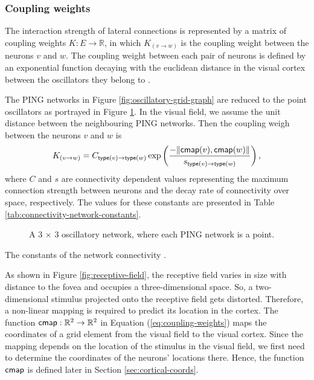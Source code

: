 \subsubsection{Coupling weights}

The interaction strength of lateral connections is represented by a matrix of coupling weights $K: E \to \mathbb{R}$, in which $K_{(v \to w)}$ is the coupling weight between the neurons $v$ and $w$. 
The coupling weight between each pair of neurons is defined by an exponential function decaying with the euclidean distance in the visual cortex between the oscillators they belong to \cite{Lowet2015}. 

The PING networks in Figure \ref{fig:oscillatory-grid-graph} are reduced to the point oscillators as portrayed in Figure \ref{fig:oscillatory-point-grid}. In the visual field, we assume the unit distance between the neighbouring PING networks. Then the coupling weigh between the neurons $v$ and $w$ is
\begin{equation}
    K_{(v \to w)} = C_{\mathsf{type}(v) \to \mathsf{type}(w)} \exp \left( \frac{-\| \mathsf{cmap}(v), \mathsf{cmap}(w) \|}{s_{\mathsf{type}(v) \to \mathsf{type}(w)}} \right),
    \label{eq:coupling-weights}
\end{equation}
where $C$ and $s$ are connectivity dependent values representing the maximum connection strength between neurons and the decay rate of connectivity over space, respectively. The values for these constants are presented in Table \ref{tab:connectivity-network-constants}.

\begin{figure}[!htp]
    \centering
    
    \caption[Point-PING oscillatory network]{A 3 $\times$ 3 oscillatory network, where each PING network is a point.}
    \label{fig:oscillatory-point-grid}
\end{figure}

\begin{table}[!htp] 
    \centering
    
    \caption[Constants of the network connectivity]{The constants of the network connectivity \cite{Lowet2015}.}
    \label{tab:connectivity-network-constants}
\end{table}

As shown in Figure \ref{fig:receptive-field}, the receptive field varies in size with distance to the fovea and occupies a three-dimensional space. So, a two-dimensional stimulus projected onto the receptive field gets distorted. Therefore, a non-linear mapping is required to predict its location in the cortex.
The function $\mathsf{cmap}: \mathbb{R}^2 \to \mathbb{R}^2$ in Equation (\ref{eq:coupling-weights}) maps the coordinates of a grid element from the visual field to the visual cortex. Since the mapping depends on the location of the stimulus in the visual field, we first need to determine the coordinates of the neurons' locations there. Hence, the function $\mathsf{cmap}$ is defined later in Section \ref{sec:cortical-coords}.

\begin{comment}

Let $\loc: V \to \mathbb{Z}_+^2$ be a function mapping a neuron to the position of the oscillator it belongs to in the grid, assuming the unit distance between the neighbouring PING networks.

\end{comment}